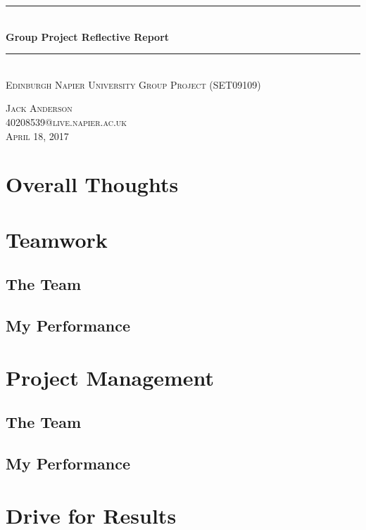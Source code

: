 \documentclass{article}
\begin{document}
	\begin{titlepage}
		\begin{center}
			\rule{12cm}{0.4pt} \\
			[0.25in]
			\huge{\bfseries Group Project Reflective Report} \\
			[2mm]
			\rule{12cm}{0.4pt} \\
			[0.25in]
			\textsc{Edinburgh Napier University}
			\textsc{Group Project (SET09109)} \\
			[110mm]
		\end{center} 
		
		\begin{flushright}
				\textsc{\large Jack Anderson \\
				40208539@live.napier.ac.uk \\
				April 18, 2017 \\
				}
			\end{flushright}
	\end{titlepage}

  	
	\tableofcontents
	\newpage

  	\section{Overall Thoughts}
  		\blindtext
  	\section{Teamwork}
  	\subsection{The Team}
  		\blindtext
  	\subsection{My Performance}
  		\blindtext
  	\section{Project Management}
  	\subsection{The Team}
  		\blindtext
  	\subsection{My Performance}
  		\blindtext
  	\section{Drive for Results}
\end{document}
